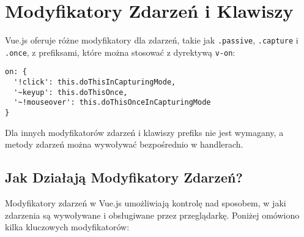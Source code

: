 \documentclass[a4paper,12pt]{article}
\begin{document}
\section{Modyfikatory Zdarzeń i Klawiszy}

Vue.js oferuje różne modyfikatory dla zdarzeń, takie jak \texttt{.passive}, \texttt{.capture} i \texttt{.once}, z prefiksami, które można stosować z dyrektywą \texttt{v-on}:

\begin{lstlisting}
on: {
  '!click': this.doThisInCapturingMode,
  '~keyup': this.doThisOnce,
  '~!mouseover': this.doThisOnceInCapturingMode
}
\end{lstlisting}

Dla innych modyfikatorów zdarzeń i klawiszy prefiks nie jest wymagany, a metody zdarzeń można wywoływać bezpośrednio w handlerach.

\subsection{Jak Działają Modyfikatory Zdarzeń?}

Modyfikatory zdarzeń w Vue.js umożliwiają kontrolę nad sposobem, w jaki zdarzenia są wywoływane i obsługiwane przez przeglądarkę. Poniżej omówiono kilka kluczowych modyfikatorów:
\end{document}
